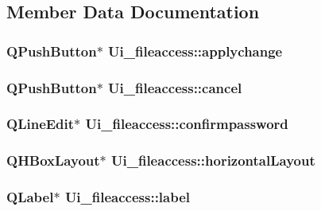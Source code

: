 \subsection{Member Data Documentation}
\hypertarget{classUi__fileaccess_aa533d85d0ba01a15b39b916fe7f98f55}{
\subsubsection[{applychange}]{\setlength{\rightskip}{0pt plus 5cm}Q\-Push\-Button$\ast$ Ui\-\_\-fileaccess\-::applychange}}\label{classUi__fileaccess_aa533d85d0ba01a15b39b916fe7f98f55}
\hypertarget{classUi__fileaccess_ab5ab6787c441e3d3b74f0a4050c1ccb9}{
\subsubsection[{cancel}]{\setlength{\rightskip}{0pt plus 5cm}Q\-Push\-Button$\ast$ Ui\-\_\-fileaccess\-::cancel}}\label{classUi__fileaccess_ab5ab6787c441e3d3b74f0a4050c1ccb9}
\hypertarget{classUi__fileaccess_a011d5a685955e19f7738172643301453}{
\subsubsection[{confirmpassword}]{\setlength{\rightskip}{0pt plus 5cm}Q\-Line\-Edit$\ast$ Ui\-\_\-fileaccess\-::confirmpassword}}\label{classUi__fileaccess_a011d5a685955e19f7738172643301453}
\hypertarget{classUi__fileaccess_a26748e27b324fea9192440863c6fbd89}{
\subsubsection[{horizontal\-Layout}]{\setlength{\rightskip}{0pt plus 5cm}Q\-H\-Box\-Layout$\ast$ Ui\-\_\-fileaccess\-::horizontal\-Layout}}\label{classUi__fileaccess_a26748e27b324fea9192440863c6fbd89}
\hypertarget{classUi__fileaccess_ae6cd96492f2c14d58d422c3fa1405f6a}{
\subsubsection[{label}]{\setlength{\rightskip}{0pt plus 5cm}Q\-Label$\ast$ Ui\-\_\-fileaccess\-::label}}\label{classUi__fileaccess_ae6cd96492f2c14d58d422c3fa1405f6a}
